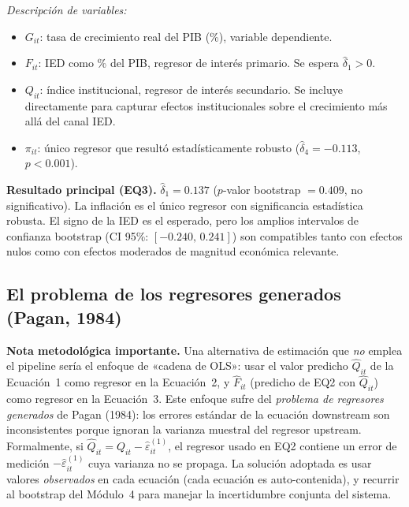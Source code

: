 \documentclass[12pt, a4paper]{article}
\theoremstyle{definition}
\begin{document}
\noindent\textit{Descripción de variables:}
\begin{itemize}
  \item $G_{it}$: tasa de crecimiento real del PIB (\%), variable dependiente.
  \item $F_{it}$: IED como \% del PIB, regresor de interés primario. Se espera $\hat\delta_1 > 0$.
  \item $Q_{it}$: índice institucional, regresor de interés secundario. Se incluye directamente para capturar efectos institucionales sobre el crecimiento más allá del canal IED.
  \item $\pi_{it}$: único regresor que resultó estadísticamente robusto ($\hat\delta_4 = -0.113$, $p < 0.001$).
\end{itemize}

\begin{resultbox}
\textbf{Resultado principal (EQ3).} $\hat\delta_1 = 0.137$ ($p$-valor bootstrap $= 0.409$, no significativo). La inflación es el único regresor con significancia estadística robusta. El signo de la IED es el esperado, pero los amplios intervalos de confianza bootstrap (CI 95\%: $[-0.240,\, 0.241]$) son compatibles tanto con efectos nulos como con efectos moderados de magnitud económica relevante.
\end{resultbox}

\subsection{El problema de los regresores generados (Pagan, 1984)}

\begin{warningbox}
\textbf{Nota metodológica importante.} Una alternativa de estimación que \emph{no} emplea el pipeline sería el enfoque de «cadena de OLS»: usar el valor predicho $\hat{Q}_{it}$ de la Ecuación~1 como regresor en la Ecuación~2, y $\hat{F}_{it}$ (predicho de EQ2 con $\hat{Q}_{it}$) como regresor en la Ecuación~3. Este enfoque sufre del \emph{problema de regresores generados} de Pagan (1984): los errores estándar de la ecuación downstream son inconsistentes porque ignoran la varianza muestral del regresor upstream. Formalmente, si $\hat{Q}_{it} = Q_{it} - \hat\varepsilon^{(1)}_{it}$, el regresor usado en EQ2 contiene un error de medición $-\hat\varepsilon^{(1)}_{it}$ cuya varianza no se propaga. La solución adoptada es usar valores \emph{observados} en cada ecuación (cada ecuación es auto-contenida), y recurrir al bootstrap del Módulo~4 para manejar la incertidumbre conjunta del sistema.
\end{warningbox}
\end{document}
